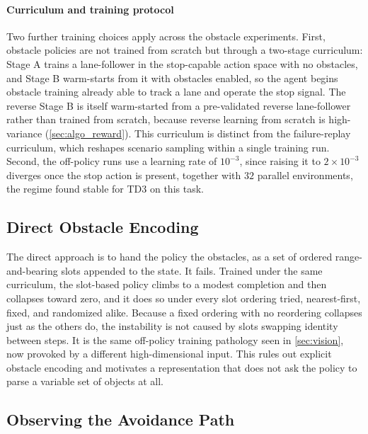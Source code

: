 \paragraph{Curriculum and training protocol}
Two further training choices apply across the obstacle experiments. First, obstacle policies are not trained from scratch but through a two-stage curriculum: Stage A trains a lane-follower in the stop-capable action space with no obstacles, and Stage B warm-starts from it with obstacles enabled, so the agent begins obstacle training already able to track a lane and operate the stop signal. The reverse Stage B is itself warm-started from a pre-validated reverse lane-follower rather than trained from scratch, because reverse learning from scratch is high-variance (\cref{sec:algo_reward}). This curriculum is distinct from the failure-replay curriculum, which reshapes scenario sampling within a single training run. Second, the off-policy runs use a learning rate of $10^{-3}$, since raising it to $2\times10^{-3}$ diverges once the stop action is present, together with $32$ parallel environments, the regime found stable for TD3 on this task.

\subsection{Direct Obstacle Encoding}

The direct approach is to hand the policy the obstacles, as a set of ordered range-and-bearing slots appended to the state. It fails. Trained under the same curriculum, the slot-based policy climbs to a modest completion and then collapses toward zero, and it does so under every slot ordering tried, nearest-first, fixed, and randomized alike. Because a fixed ordering with no reordering collapses just as the others do, the instability is not caused by slots swapping identity between steps. It is the same off-policy training pathology seen in \cref{sec:vision}, now provoked by a different high-dimensional input. This rules out explicit obstacle encoding and motivates a representation that does not ask the policy to parse a variable set of objects at all.

\subsection{Observing the Avoidance Path}

